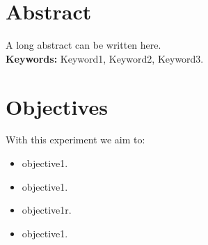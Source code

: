 \begin{minipage}{\textwidth}


	
	\section*{Abstract}
	\justifying
	\noindent
A long abstract can be written here.\\

\textbf{Keywords:} Keyword1, Keyword2, Keyword3.


\section*{Objectives}
With this experiment we aim to:
\justifying
\noindent
\begin{itemize}
    \item objective1.
    \item objective1.
    \item objective1r.
    \item objective1.
\end{itemize}


\end{minipage}